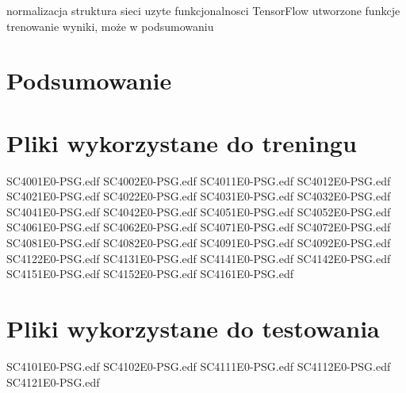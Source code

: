 \documentclass[12pt, notitlepage]{report}
\begin{document}
        normalizacja 
        struktura sieci
        uzyte funkcjonalnosci TensorFlow
        utworzone funkcje
        trenowanie
        wyniki, może w podsumowaniu

    \chapter*{Podsumowanie}


    \begin{appendices}
        \chapter{Pliki wykorzystane do treningu}
        \label{appendix:A}
        SC4001E0-PSG.edf \newline
        SC4002E0-PSG.edf \newline
        SC4011E0-PSG.edf \newline
        SC4012E0-PSG.edf \newline
        SC4021E0-PSG.edf \newline
        SC4022E0-PSG.edf \newline
        SC4031E0-PSG.edf \newline
        SC4032E0-PSG.edf \newline
        SC4041E0-PSG.edf \newline
        SC4042E0-PSG.edf \newline
        SC4051E0-PSG.edf \newline
        SC4052E0-PSG.edf \newline
        SC4061E0-PSG.edf \newline
        SC4062E0-PSG.edf \newline
        SC4071E0-PSG.edf \newline
        SC4072E0-PSG.edf \newline
        SC4081E0-PSG.edf \newline
        SC4082E0-PSG.edf \newline
        SC4091E0-PSG.edf \newline
        SC4092E0-PSG.edf \newline
        SC4122E0-PSG.edf \newline
        SC4131E0-PSG.edf \newline
        SC4141E0-PSG.edf \newline
        SC4142E0-PSG.edf \newline
        SC4151E0-PSG.edf \newline
        SC4152E0-PSG.edf \newline
        SC4161E0-PSG.edf

        \chapter{Pliki wykorzystane do testowania}
        \label{appendix:B}
        SC4101E0-PSG.edf \newline
        SC4102E0-PSG.edf \newline
        SC4111E0-PSG.edf \newline
        SC4112E0-PSG.edf \newline
        SC4121E0-PSG.edf

    \end{appendices}
\end{document}
